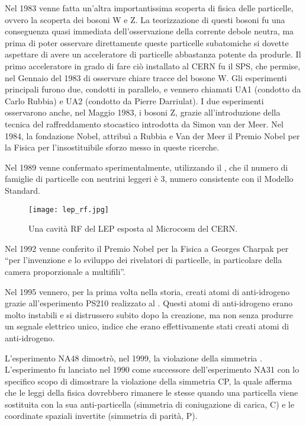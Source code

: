 			Nel 1983 venne fatta un'altra importantissima scoperta di fisica delle particelle, ovvero la scoperta dei bosoni W e Z. La teorizzazione di questi bosoni fu una conseguenza quasi immediata dell'osservazione della corrente debole neutra, ma prima di poter osservare direttamente queste particelle subatomiche si dovette aspettare di avere un acceleratore di particelle abbastanza potente da produrle. Il primo acceleratore in grado di fare ciò installato al \ac{CERN} fu il \ac{SPS}, che permise, nel Gennaio del 1983 di osservare chiare tracce del bosone W. Gli esperimenti principali furono due, condotti in parallelo, e vennero chiamati UA1 (condotto da Carlo Rubbia) e UA2 (condotto da Pierre Darriulat). I due esperimenti osservarono anche, nel Maggio 1983, i bosoni Z, grazie all'introduzione della tecnica del raffreddamento stocastico introdotta da Simon van der Meer. Nel 1984, la fondazione Nobel, attribuì a Rubbia e Van der Meer il Premio Nobel per la Fisica per l'insostituibile sforzo messo in queste ricerche.
			
			Nel 1989 venne confermato sperimentalmente, utilizzando il , che il numero di famiglie di particelle con neutrini leggeri è 3, numero consistente con il Modello Standard.
			
			\begin{figure}[h!]
				\begin{center}
					\texttt{[image: lep\_rf.jpg]}
				\end{center}
				\caption[Cavità RF del LEP]{Una cavità RF del LEP esposta al Microcosm del CERN.}
				\label{fig:lep_rf}
			\end{figure}
			
			Nel 1992 venne conferito il Premio Nobel per la Fisica a Georges Charpak per ``per l'invenzione e lo sviluppo dei rivelatori di particelle, in particolare della camera proporzionale a multifili''.
			
			Nel 1995 vennero, per la prima volta nella storia, creati atomi di anti-idrogeno grazie all'esperimento PS210 realizzato al . Questi atomi di anti-idrogeno erano molto instabili e si distrussero subito dopo la creazione, ma non senza produrre un segnale elettrico unico, indice che erano effettivamente stati creati atomi di anti-idrogeno.
			
			L'esperimento NA48 dimostrò, nel 1999, la violazione della simmetria . L'esperimento fu lanciato nel 1990 come successore dell'esperimento NA31 con lo specifico scopo di dimostrare la violazione della simmetria \ac{CP}, la quale afferma che le leggi della fisica dovrebbero rimanere le stesse quando una particella viene sostituita con la sua anti-particella (simmetria di coniugazione di carica, C) e le coordinate spaziali invertite (simmetria di parità, P).
			
